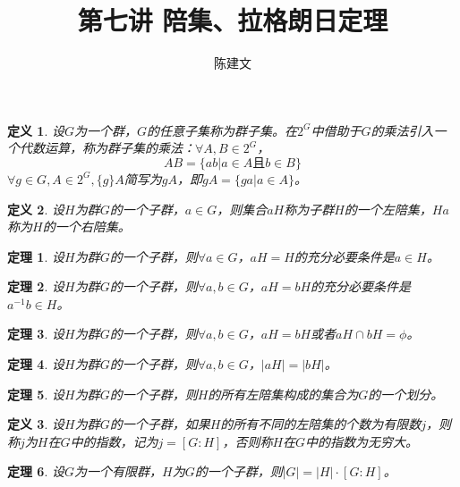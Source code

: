 \documentclass{article}
\newtheorem{Def}{定义}
\newtheorem{Thm}{定理}
\begin{document}
\begin{CJK*}{UTF8}{gbsn}
  \title{第七讲 陪集、拉格朗日定理}
  \author{陈建文}
  \maketitle
  \begin{Def}
    设$G$为一个群，$G$的任意子集称为群子集。在$2^G$中借助于$G$的乘法引入一个代数运算，称为群子集的乘法：$\forall A,B\in 2^G$，
    \[AB=\{ab|a\in A \text{且} b\in B\}\]
    $\forall g\in G,A\in 2^G,\{g\}A$简写为$gA$，即$gA=\{ga|a\in A\}$。
  \end{Def}

\begin{Def}
  设$H$为群$G$的一个子群，$a\in G$，则集合$aH$称为子群$H$的一个左陪集，$Ha$称为$H$的一个右陪集。
\end{Def}

\begin{Thm}
  设$H$为群$G$的一个子群，则$\forall a\in G$，$aH=H$的充分必要条件是$a\in H$。
\end{Thm}
  
\begin{Thm}
  设$H$为群$G$的一个子群，则$\forall a,b\in G$，$aH=bH$的充分必要条件是$a^{-1}b\in H$。
\end{Thm}

\begin{Thm}
  设$H$为群$G$的一个子群，则$\forall a,b\in G$，$aH=bH$或者$aH\cap bH=\phi$。
\end{Thm}

\begin{Thm}
  设$H$为群$G$的一个子群，则$\forall a,b\in G$，$|aH|=|bH|$。
\end{Thm}

\begin{Thm}
  设$H$为群$G$的一个子群，则$H$的所有左陪集构成的集合为$G$的一个划分。
\end{Thm}

\begin{Def}
  设$H$为群$G$的一个子群，如果$H$的所有不同的左陪集的个数为有限数$j$，则称$j$为$H$在$G$中的指数，记为$j=[G:H]$，否则称$H$在$G$中的指数为无穷大。
\end{Def}

\begin{Thm}
 设$G$为一个有限群，$H$为$G$的一个子群，则$|G|=|H|\cdot [G:H]$。 
\end{Thm}


\end{CJK*}
\end{document}

